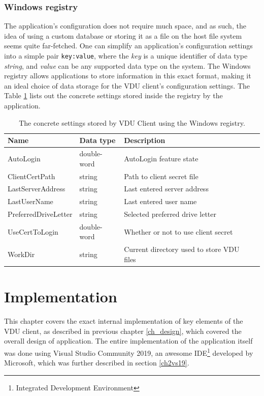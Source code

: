 \subsection{Windows registry}
The application's configuration does not require much space, and as such, the idea of using a custom database or storing it as a file on the host file system seems quite far-fetched. 
One can simplify an application's configuration settings into a simple pair \lstinline{key:value}, where the \textit{key} is a unique identifier of data type \textit{string}, and \textit{value} can be any supported data type on the system. The Windows registry allows applications to store information in this exact format, making it an ideal choice of data storage for the VDU client's configuration settings. The Table \ref{vduregistrytable} lists out the concrete settings stored inside the registry by the application.
\begin{table}[hbt]
\centering
\label{vduregistrytable}
\begin{tabular}{|l|l|l|l|}
\hline
\textbf{Name} & \textbf{Data type} & \textbf{Description} \\ \hline
 AutoLogin & double-word & AutoLogin feature state \\ \hline
 ClientCertPath & string & Path to client secret file \\ \hline
 LastServerAddress & string & Last entered server address \\ \hline
 LastUserName & string & Last entered user name \\ \hline
 PreferredDriveLetter & string & Selected preferred drive letter \\ \hline
 UseCertToLogin & double-word & Whether or not to use client secret \\ \hline
 WorkDir & string & Current directory used to store VDU files  \\ \hline
\end{tabular}
\caption{The concrete settings stored by VDU Client using the Windows registry.}
\end{table} 



\chapter{Implementation}
\label{ch_implementation}
This chapter covers the exact internal implementation of key elements of the VDU client, as described in previous chapter \ref{ch_design}, which covered the overall design of application. The entire implementation of the application itself was done using Visual Studio Community 2019, an awesome IDE\footnote{Integrated Development Environment} developed by Microsoft, which was further described in section \ref{ch2vs19}. 

